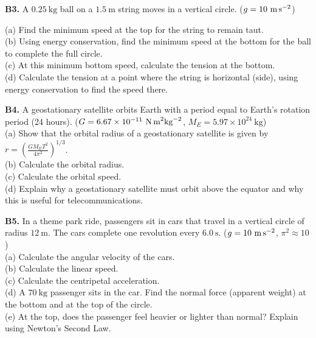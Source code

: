 \begin{exercisebox}[6]
\vspace{0.4cm}

\textbf{B3.} A $0.25\ \text{kg}$ ball on a
$1.5\ \text{m}$ string moves in a vertical circle.
($g = 10\ \text{m\,s}^{-2}$)\\[4pt]
\begin{center}
\end{center}
(a) Find the minimum speed at the top for the
string to remain taut.\\
(b) Using energy conservation, find the minimum
speed at the bottom for the ball to complete
the full circle.\\
(c) At this minimum bottom speed, calculate the
tension at the bottom.\\
(d) Calculate the tension at a point where the
string is horizontal (side), using energy
conservation to find the speed there.
\hfill{}

\vspace{0.4cm}

\textbf{B4.} A geostationary satellite orbits Earth
with a period equal to Earth's rotation period
(24 hours). ($G = 6.67\times10^{-11}\ \text{N\,m}^2\text{kg}^{-2}$,
$M_E = 5.97\times10^{24}\ \text{kg}$)\\[4pt]
(a) Show that the orbital radius of a geostationary
satellite is given by
$r = \left(\frac{GM_E T^2}{4\pi^2}\right)^{1/3}$.\\
(b) Calculate the orbital radius.\\
(c) Calculate the orbital speed.\\
(d) Explain why a geostationary satellite must orbit
above the equator and why this is useful for
telecommunications.
\hfill{}

\vspace{0.4cm}

\textbf{B5.} In a theme park ride, passengers sit in
cars that travel in a vertical circle of radius
$12\ \text{m}$. The cars complete one revolution
every $6.0\ \text{s}$.
($g = 10\ \text{m\,s}^{-2}$, $\pi^2 \approx 10$)\\[4pt]
(a) Calculate the angular velocity of the cars.\\
(b) Calculate the linear speed.\\
(c) Calculate the centripetal acceleration.\\
(d) A $70\ \text{kg}$ passenger sits in the car.
Find the normal force (apparent weight) at the
bottom and at the top of the circle.\\
(e) At the top, does the passenger feel heavier
or lighter than normal? Explain using Newton's
Second Law.
\hfill{}

\end{exercisebox}
